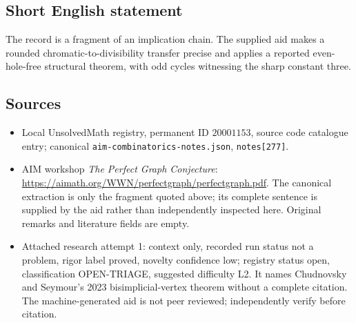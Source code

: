 \documentclass[11pt]{article}
\begin{document}
\subsection{Short English statement}
The record is a fragment of an implication chain. The supplied aid makes a rounded chromatic-to-divisibility transfer precise and applies a reported even-hole-free structural theorem, with odd cycles witnessing the sharp constant three.
\subsection{Sources}
\begin{itemize}
\item Local UnsolvedMath registry, permanent ID $20001153$, source code catalogue entry; canonical \texttt{aim-combinatorics-notes.json}, \texttt{notes[277]}.
\item AIM workshop \emph{The Perfect Graph Conjecture}: \url{https://aimath.org/WWN/perfectgraph/perfectgraph.pdf}. The canonical extraction is only the fragment quoted above; its complete sentence is supplied by the aid rather than independently inspected here. Original remarks and literature fields are empty.
\item Attached research attempt 1: context only, recorded run status not a problem, rigor label proved, novelty confidence low; registry status open, classification OPEN-TRIAGE, suggested difficulty L2. It names Chudnovsky and Seymour's 2023 bisimplicial-vertex theorem without a complete citation. The machine-generated aid is not peer reviewed; independently verify before citation.
\end{itemize}
\end{document}
